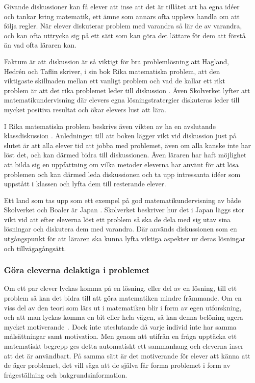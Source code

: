 \textcolor{turkos} {
Givande diskussioner kan få elever att inse att det är tillåtet att ha egna idéer och tankar kring matematik, ett ämne som annars ofta upplevs handla om att följa regler. När elever diskuterar problem med varandra så lär de av varandra, och kan ofta uttrycka sig på ett sätt som kan göra det lättare för dem att förstå än vad ofta läraren kan. \cite{TheElephant}
}

\textcolor{turkos} {Faktum är att diskussion är så viktigt för bra problemlösning att Hagland, Hedrén och Taflin skriver, i sin bok Rika matematiska problem, att den viktigaste skillnaden mellan ett vanligt problem och vad de kallar ett rikt problem är att det rika problemet leder till diskussion \cite{RikaProblem}. Även Skolverket lyfter att matematikundervisning där elevers egna lösningstratergier diskuteras leder till mycket positiva resultat och ökar elevers lust att lära\cite{Skolverket03}.}

\textcolor{turkos}{I Rika matematiska problem beskrivs även vikten av ha en avslutande klassdiskussion \cite{RikaProblem}. Anledningen till att boken lägger vikt vid diskussion just på slutet är att alla elever tid att jobba med problemet, även om alla kanske inte har löst det, och kan därmed bidra till diskussionen. Även läraren har haft möjlighet att bilda sig en uppfattning om vilka metoder eleverna har använt för att lösa problemen och kan därmed leda diskussionen och ta upp intressanta idéer som uppstått i klassen och lyfta dem till resterande elever.}

\textcolor{turkos} {
Ett land som tas upp som ett exempel på god matematikundervisning av både Skolverket och Boaler är Japan \cite{TheElephant}\cite{Skolverket03}. Skolverket beskriver hur det i Japan läggs stor vikt vid att efter eleverna löst ett problem så ska de dela med sig utav sina lösningar och diskutera dem med varandra. Där används diskussionen som en utgångspunkt för att läraren ska kunna lyfta viktiga aspekter ur deras lösningar och tillvägagångsätt. }

    \subsubsection{Göra eleverna delaktiga i problemet}
        \label{sec:delaktighet}
        \textcolor{WildStrawberry}{
            Om ett par elever lyckas komma på en lösning, eller del av en lösning, till ett problem så kan det bidra till att göra matematiken mindre främmande. Om en viss del av den teori som lärs ut i matematiken blir i form av egen utforskning, och att man lyckas komma en bit eller hela vägen, så kan denna belöning agera mycket motiverande~\cite{TheElephant}. Dock inte uteslutande då varje individ inte har samma målsättningar samt motivation.} \textcolor{lila}{Men genom att utifrån en fråga upptäcka ett matematiskt begrepp ges detta automatiskt ett sammanhang och eleverna inser att det är användbart. På samma sätt är det motiverande för elever att känna att de äger problemet, det vill säga att de själva får forma problemet i form av frågeställning och bakgrundsinformation.}
            

